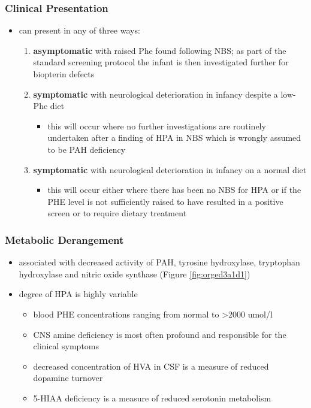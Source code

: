 \documentclass{scrartcl}
\begin{document}
\subsubsection{Clinical Presentation}
\label{sec:orgbf5f40b}
\begin{itemize}
\item can present in any of three ways:
\begin{enumerate}
\item \textbf{asymptomatic} with raised Phe found following NBS; as part of
the standard screening protocol the infant is then investigated
further for biopterin defects
\item \textbf{symptomatic} with neurological deterioration in infancy despite a
low-Phe diet
\begin{itemize}
\item this will occur where no further investigations are routinely
undertaken after a finding of HPA in NBS which is wrongly
assumed to be PAH deficiency
\end{itemize}
\item \textbf{symptomatic} with neurological deterioration in infancy on a
normal diet
\begin{itemize}
\item this will occur either where there has been no NBS
for HPA or if the PHE level is not sufficiently raised to have
resulted in a positive screen or to require dietary treatment
\end{itemize}
\end{enumerate}
\end{itemize}
\subsubsection{Metabolic Derangement}
\label{sec:org49c9cbb}
\begin{itemize}
\item associated with decreased activity of PAH, tyrosine hydroxylase,
tryptophan hydroxylase and nitric oxide synthase (Figure \ref{fig:orged3a1d1})
\item degree of HPA is highly variable
\begin{itemize}
\item blood PHE concentrations ranging from normal to \textgreater{}2000 umol/l
\item CNS amine deficiency is most often profound and responsible for
the clinical symptoms
\item decreased concentration of HVA in CSF is a measure of reduced
dopamine turnover
\item 5-HIAA deficiency is a measure of reduced serotonin metabolism
\end{itemize}
\end{itemize}
\end{document}
